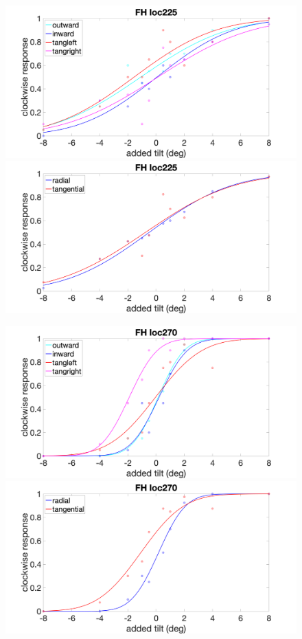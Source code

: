\documentclass[11pt]{article} %
\begin{document}
\begin{figure}[H]
\centering %
\includegraphics[scale=.15]{Images/FH_PF_loc225_4conds.png}
\includegraphics[scale=.15]{Images/FH_PF_loc225_2conds.png}
\end{figure}
\begin{figure}[H]
\centering %
\includegraphics[scale=.15]{Images/FH_PF_loc270_4conds.png}
\includegraphics[scale=.15]{Images/FH_PF_loc270_2conds.png}
\end{figure}
\end{document}
